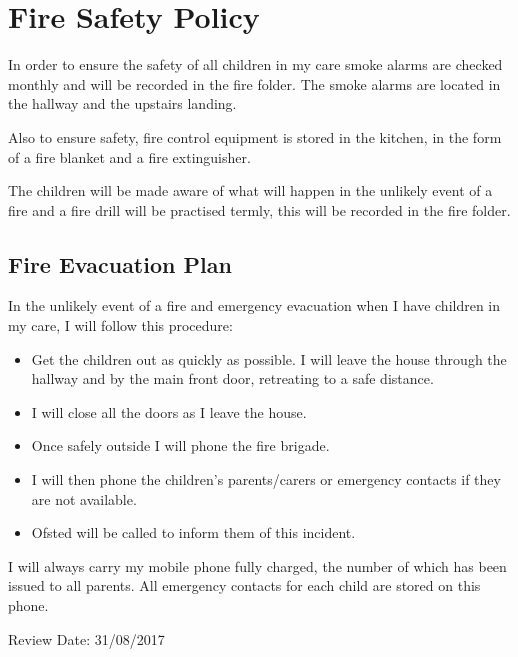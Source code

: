 
\section{Fire Safety Policy}

In order to ensure the safety of all children in my care smoke alarms
are checked monthly and will be recorded in the fire folder. The smoke
alarms are located in the hallway and the upstairs landing.

Also to ensure safety, fire control equipment is stored in the kitchen, 
in the form of a fire blanket and a fire extinguisher.

The children will be made aware of what will happen in the unlikely
event of a fire and a fire drill will be practised termly, this
will be recorded in the fire folder.

\subsection{Fire Evacuation Plan}

In the unlikely event of a fire and emergency evacuation when I have
children in my care, I will follow this procedure:

\begin{itemize}
\item
  Get the children out as quickly as possible. I will leave the house
  through the hallway and by the main front door, retreating to a safe
  distance.
\item
  I will close all the doors as I leave the house.
\item
  Once safely outside I will phone the fire brigade.
\item
  I will then phone the children's parents/carers or emergency contacts
  if they are not available.
\item
  Ofsted will be called to inform them of this incident.
\end{itemize}

I will always carry my mobile phone fully charged, the number of which
has been issued to all parents. All emergency contacts for each child are
stored on this phone.

Review Date: 31/08/2017


